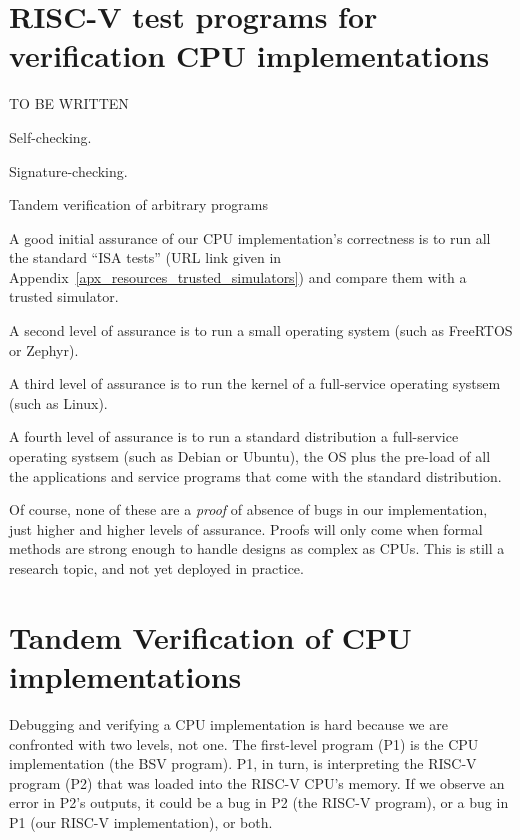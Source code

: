 
\section{RISC-V test programs for verification CPU implementations}

TO BE WRITTEN

Self-checking.

Signature-checking.

Tandem verification of arbitrary programs

A good initial assurance of our CPU implementation's correctness is to
run all the standard ``ISA tests'' (URL link given in
Appendix~\ref{apx_resources_trusted_simulators}) and compare them with
a trusted simulator.

A second level of assurance is to run a small operating system (such
as FreeRTOS or Zephyr).

A third level of assurance is to run the kernel of a full-service
operating systsem (such as Linux).

A fourth level of assurance is to run a standard distribution a
full-service operating systsem (such as Debian or Ubuntu), {\ie} the
OS plus the pre-load of all the applications and service programs that
come with the standard distribution.

Of course, none of these are a \emph{proof} of absence of bugs in our
implementation, just higher and higher levels of assurance.  Proofs
will only come when formal methods are strong enough to handle designs
as complex as CPUs.  This is still a research topic, and not yet
deployed in practice.


\section{Tandem Verification of CPU implementations}

\label{Sec_Tandem_Verification}


Debugging and verifying a CPU implementation is hard because we are
confronted with two levels, not one.  The first-level program (P1) is
the CPU implementation (the BSV program).  P1, in turn, is
interpreting the RISC-V program (P2) that was loaded into the RISC-V
CPU's memory. If we observe an error in P2's outputs, it could be a
bug in P2 (the RISC-V program), or a bug in P1 (our RISC-V
implementation), or both.

